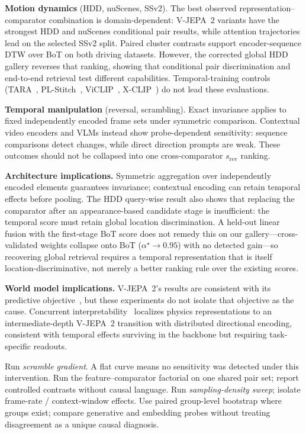 \documentclass{article}
\theoremstyle{remark}
\begin{document}
\textbf{Motion dynamics} (HDD, nuScenes, SSv2). The best observed representation--comparator combination is domain-dependent: V-JEPA~2 variants have the strongest HDD and nuScenes conditional pair results, while attention trajectories lead on the selected SSv2 split. Paired cluster contrasts support encoder-sequence DTW over BoT on both driving datasets. However, the corrected global HDD gallery reverses that ranking, showing that conditional pair discrimination and end-to-end retrieval test different capabilities. Temporal-training controls (TARA~\cite{tara}, PL-Stitch~\cite{plstitch}, ViCLIP~\cite{viclip}, X-CLIP~\cite{xclip}) do not lead these evaluations.

\textbf{Temporal manipulation} (reversal, scrambling). Exact invariance applies to fixed independently encoded frame sets under symmetric comparison. Contextual video encoders and VLMs instead show probe-dependent sensitivity: sequence comparisons detect changes, while direct direction prompts are weak. These outcomes should not be collapsed into one cross-comparator $s_\text{rev}$ ranking.

\textbf{Architecture implications.} Symmetric aggregation over independently encoded elements guarantees invariance; contextual encoding can retain temporal effects before pooling. The HDD query-wise result also shows that replacing the comparator after an appearance-based candidate stage is insufficient: the temporal score must retain global location discrimination. A held-out linear fusion with the first-stage BoT score does not remedy this on our gallery---cross-validated weights collapse onto BoT ($\alpha^\star\!\to\!0.95$) with no detected gain---so recovering global retrieval requires a temporal representation that is itself location-discriminative, not merely a better ranking rule over the existing scores.

\textbf{World model implications.} V-JEPA~2's results are consistent with its predictive objective~\cite{lecun_worldmodel,vjepa2}, but these experiments do not isolate that objective as the cause. Concurrent interpretability~\cite{joseph2026physics} localizes physics representations to an intermediate-depth V-JEPA~2 transition with distributed directional encoding, consistent with temporal effects surviving in the backbone but requiring task-specific readouts.

\begin{algorithm}[h]
\caption{Temporal Sensitivity Diagnostic Protocol}
\label{alg:decision}
\begin{algorithmic}[1]
\State Run \emph{scramble gradient}. A flat curve means no sensitivity was detected under this intervention.
\State Run the feature--comparator factorial on one shared pair set; report controlled contrasts without causal language.
\State Run \emph{sampling-density sweep}; isolate frame-rate / context-window effects.
\State Use paired group-level bootstrap where groups exist; compare generative and embedding probes without treating disagreement as a unique causal diagnosis.
\end{algorithmic}
\end{algorithm}
\end{document}
